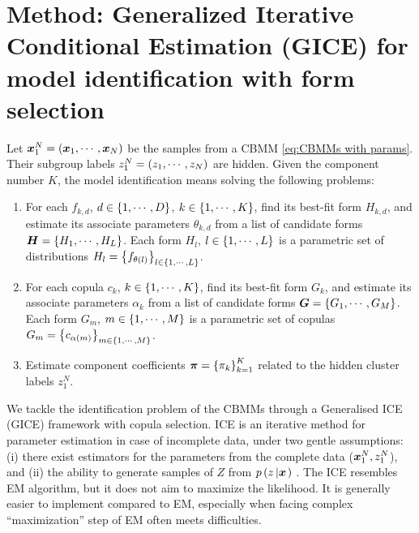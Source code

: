 \section{Method: Generalized Iterative Conditional Estimation (GICE) for model identification with form selection}
\label{sec:Iterative conditional estimation for model identification with form selection}

Let $\boldsymbol{x}_1^N = \left(\boldsymbol{x}_1, \cdots, \boldsymbol{x}_N\right)$ be the samples from a CBMM \eqref{eq:CBMMs with params}. Their subgroup labels $z_1^N=\left(z_1,\cdots,z_N\right)$ are hidden. Given the component number $K$, the model identification means 
solving the following problems:
\begin{enumerate}
    \item For each  $f_{k,d}$, $d\in\left\{1,\cdots,D\right\}$, $k\in\left\{1,\cdots,K\right\}$, find its best-fit form $H_{k,d}$, and estimate its associate parameters $\theta_{k,d}$ from a list of candidate forms $\boldsymbol{H} = \left\{H_1,\cdots,H_L\right\}$. Each form $H_l$, $l\in\left\{1,\cdots,L\right\}$ is a parametric set of distributions $H_l=\set{f_{\theta\seq{l}}}_{\blueC{l\in\set{1,\cdots,L}}}$.
    \item For each copula $c_k$, $k\in\left\{1,\cdots,K\right\}$, find its best-fit form $G_{k}$, and estimate its associate parameters $\alpha_k$ from a list of candidate forms $\boldsymbol{G} = \left\{G_1,\cdots,G_M\right\}$. Each form $G_m$, $m\in\left\{1,\cdots,M\right\}$ is a parametric set of copulas $G_m=\set{c_{\alpha\seq{m}}}_{\blueC{m\in\set{1,\cdots,M}}}$.
    \item Estimate component coefficients $\boldsymbol{\pi}=\left\{\pi_k\right\}_{k=1}^K$ related to the hidden cluster labels $z_1^N$.
\end{enumerate}
We tackle the identification problem of the CBMMs through a Generalised ICE (GICE) framework with copula selection.  
ICE is an iterative method for parameter estimation in case of incomplete data, under two gentle assumptions: (i) there exist estimators for the parameters from the complete data ($\boldsymbol{x}_1^N, z_1^N$), and (ii) the ability to generate samples of $Z$ from $p\left( z \left| \boldsymbol{x} \right.\right)$ \cite{pieczynski2007convergence}. %
The ICE resembles  EM algorithm, but it does not aim to maximize the likelihood. It is generally easier to implement compared to EM, especially when facing complex  ``maximization'' step of EM often meets difficulties. 

